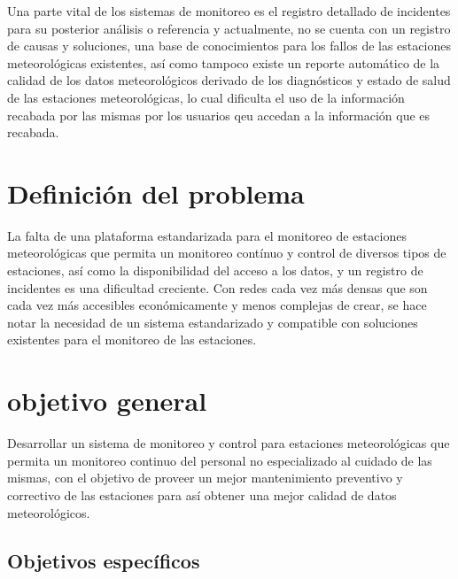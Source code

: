 Una parte vital de los sistemas de monitoreo es el registro detallado de incidentes para su posterior análisis o referencia y actualmente, no se cuenta con un registro de causas y soluciones, una base de conocimientos para los fallos de las estaciones meteorológicas existentes, así como tampoco existe un reporte automático de la calidad de los datos meteorológicos derivado de los diagnósticos y estado de salud de las estaciones meteorológicas, lo cual dificulta el uso de la información recabada por las mismas por los usuarios qeu accedan a la información que es recabada.


\section{Definición del problema}

La falta de una plataforma estandarizada para el monitoreo de estaciones meteorológicas que permita un monitoreo contínuo y control de diversos tipos de estaciones, así como la disponibilidad del acceso a los datos, y un registro de incidentes es una dificultad creciente. Con redes cada vez más densas que son cada vez más accesibles económicamente y menos complejas de crear, se hace notar la necesidad de un sistema estandarizado y compatible con soluciones existentes para el monitoreo de las estaciones.




\section{objetivo general}

Desarrollar un sistema de monitoreo y control para estaciones meteorológicas que permita un monitoreo continuo del personal no especializado al cuidado de las mismas, con el objetivo de proveer un mejor mantenimiento preventivo y correctivo de las estaciones para así obtener una mejor calidad de datos meteorológicos.

\subsection{Objetivos específicos}

